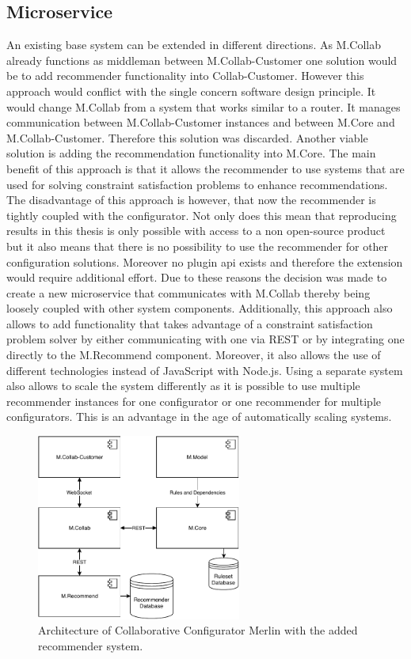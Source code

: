 \subsection{Microservice}

An existing base system can be extended in different directions. As M.Collab already functions as middleman between M.Collab-Customer one solution would be to add recommender functionality into Collab-Customer. However this approach would conflict with the single concern software design principle. It would change M.Collab from a system that works similar to a router. It manages communication between M.Collab-Customer instances and between M.Core and M.Collab-Customer. Therefore this solution was discarded.
Another viable solution is adding the recommendation functionality into M.Core. The main benefit of this approach is that it allows the recommender to use systems that are used for solving constraint satisfaction problems to enhance recommendations. The disadvantage of this approach is however, that now the recommender is tightly coupled with the configurator. Not only does this mean that reproducing results in this thesis is only possible with access to a non open-source product but it also means that there is no possibility to use the recommender for other configuration solutions. Moreover no plugin api exists and therefore the extension would require additional effort. Due to these reasons the decision was made to create a new microservice that communicates with M.Collab thereby being loosely coupled with other system components. Additionally, this approach also allows to add functionality that takes  advantage of a constraint satisfaction problem solver by either communicating with one via REST or by integrating one directly to the M.Recommend component. Moreover, it also allows the use of different technologies instead of JavaScript with Node.js. Using a separate system also allows to scale the system differently as it is possible to use multiple recommender instances for one configurator or one recommender for multiple configurators. This is an advantage in the age of automatically scaling systems.

\begin{figure}
    \centering
    \includegraphics[width=0.6\textwidth]{./figures/50_design_and_implementation/MerlinCollabRecommender.pdf}
    \caption{Architecture of Collaborative Configurator Merlin with the added recommender system.}
    \label{fig:DesignImplementation:RecommenderForCollaborativeConfiguratorMerlin}
\end{figure}

